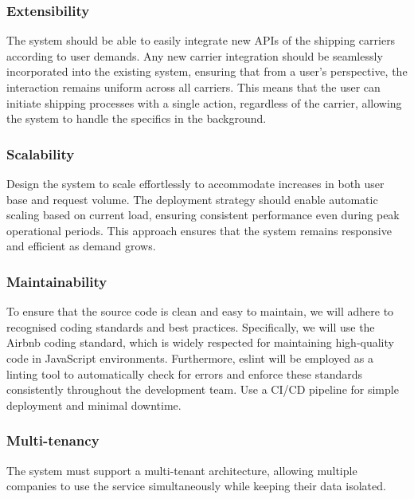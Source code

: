 \subsubsection{Extensibility}
The system should be able to easily integrate new APIs of the shipping carriers according to user demands.
Any new carrier integration should be seamlessly incorporated into the existing system, ensuring that from a user's perspective, the interaction remains uniform across all carriers.
This means that the user can initiate shipping processes with a single action, regardless of the carrier, allowing the system to handle the specifics in the background.

\subsubsection{Scalability}
Design the system to scale effortlessly to accommodate increases in both user base and request volume. 
The deployment strategy should enable automatic scaling based on current load, ensuring consistent performance even during peak operational periods. 
This approach ensures that the system remains responsive and efficient as demand grows.


\subsubsection{Maintainability}
To ensure that the source code is clean and easy to maintain, we will adhere to recognised coding standards and best practices. 
Specifically, we will use the Airbnb coding standard, which is widely respected for maintaining high-quality code in JavaScript environments.
Furthermore, \gls{eslint} will be employed as a linting tool to automatically check for errors and enforce these standards consistently throughout the development team.
Use a \ac{CI}/\ac{CD} pipeline for simple deployment and minimal downtime. 

\subsubsection{Multi-tenancy}
The system must support a multi-tenant architecture, allowing multiple companies to use the service simultaneously while keeping their data isolated.

